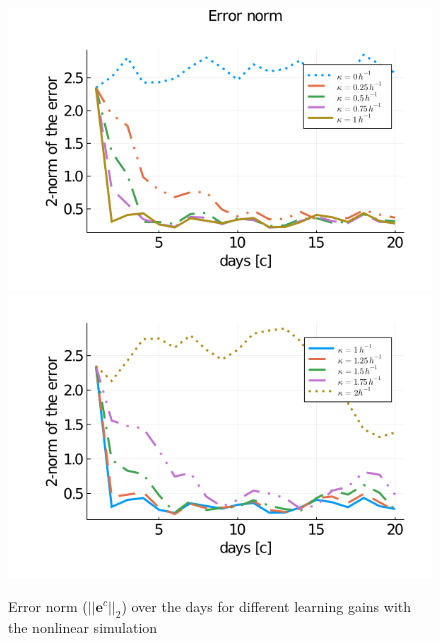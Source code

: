 \begin{figure}[h]
	\centering
	\includegraphics[scale=0.6]{pictures/plots/manual_calc_variation_kappa/variation_kappa_leq_1_hetero.png}
	\bigbreak
	\includegraphics[scale=0.6]{pictures/plots/manual_calc_variation_kappa/variation_kappa_geq_1_hetero.png}
	\caption{Error norm ($||\boldsymbol{e}^c||_2$) over the days for different learning gains with the nonlinear simulation}
	\label{fig:error_norm}
\end{figure} 

